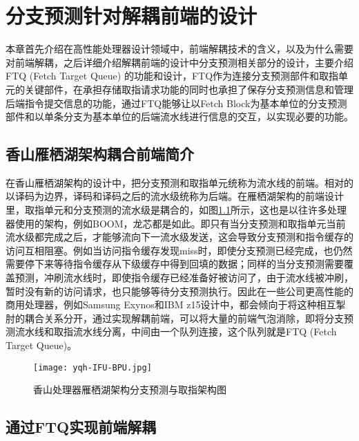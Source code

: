 \chapter{分支预测针对解耦前端的设计}

本章首先介绍在高性能处理器设计领域中，前端解耦技术的含义，以及为什么需要对前端解耦，之后详细介绍解耦前端的设计中分支预测相关部分的设计，主要介绍FTQ (Fetch Target Queue) 的功能和设计，FTQ作为连接分支预测部件和取指单元的关键部件，在承担存储取指请求功能的同时也承担了保存分支预测信息和管理后端指令提交信息的功能，通过FTQ能够让以Fetch Block为基本单位的分支预测部件和以单条分支为基本单位的后端流水线进行信息的交互，以实现必要的功能。

\section{香山雁栖湖架构耦合前端简介}


在香山雁栖湖架构的设计中，把分支预测和取指单元统称为流水线的前端。相对的以译码为边界，译码和译码之后的流水级统称为后端。在雁栖湖架构的前端设计里，取指单元和分支预测的流水级是耦合的，如图\ref{fig:figure41}所示，这也是以往许多处理器使用的架构，例如BOOM\cite{boom-spec}，龙芯\cite{loongson}都是如此。即只有当分支预测和取指单元当前流水级都完成之后，才能够流向下一流水级发送，这会导致分支预测和指令缓存的访问互相阻塞。例如当访问指令缓存发现miss时，即使分支预测已经完成，也仍然需要停下来等待指令缓存从下级缓存中得到回填的数据；同样的当分支预测需要覆盖预测，冲刷流水线时，即使指令缓存已经准备好被访问了，由于流水线被冲刷，暂时没有新的访问请求，也只能够等待分支预测执行。因此在一些公司更高性能的商用处理器，例如Samsung Exynos\cite{samsung-exynos}和IBM z15\cite{ibm-z15}设计中，都会倾向于将这种相互掣肘的耦合关系分开，通过实现解耦前端，可以将大量的前端气泡消除，即将分支预测流水线和取指流水线分离，中间由一个队列连接，这个队列就是FTQ (Fetch Target Queue)。

\begin{figure}[htb]
	\centering
	\setlength\tabcolsep{3pt}  %
	\vspace{5pt} %
	\texttt{[image: yqh-IFU-BPU.jpg]}
	\caption{香山处理器雁栖湖架构分支预测与取指架构图}
    \label{fig:figure41}
\end{figure}

\section{通过FTQ实现前端解耦}

